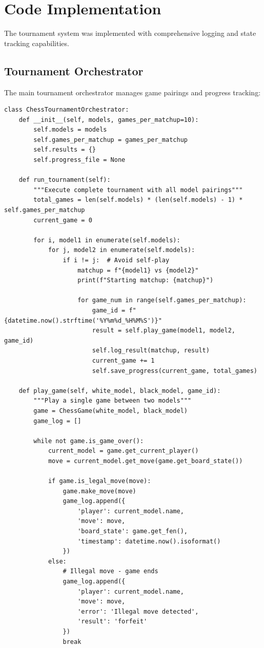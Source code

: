 \documentclass[11pt,a4paper]{report}
\begin{document}
\section{Code Implementation}
The tournament system was implemented with comprehensive logging and state tracking capabilities.

\subsection{Tournament Orchestrator}
The main tournament orchestrator manages game pairings and progress tracking:

\begin{lstlisting}[style=Python]
class ChessTournamentOrchestrator:
    def __init__(self, models, games_per_matchup=10):
        self.models = models
        self.games_per_matchup = games_per_matchup
        self.results = {}
        self.progress_file = None
        
    def run_tournament(self):
        """Execute complete tournament with all model pairings"""
        total_games = len(self.models) * (len(self.models) - 1) * self.games_per_matchup
        current_game = 0
        
        for i, model1 in enumerate(self.models):
            for j, model2 in enumerate(self.models):
                if i != j:  # Avoid self-play
                    matchup = f"{model1} vs {model2}"
                    print(f"Starting matchup: {matchup}")
                    
                    for game_num in range(self.games_per_matchup):
                        game_id = f"{datetime.now().strftime('%Y%m%d_%H%M%S')}"
                        result = self.play_game(model1, model2, game_id)
                        self.log_result(matchup, result)
                        current_game += 1
                        self.save_progress(current_game, total_games)
                        
    def play_game(self, white_model, black_model, game_id):
        """Play a single game between two models"""
        game = ChessGame(white_model, black_model)
        game_log = []
        
        while not game.is_game_over():
            current_model = game.get_current_player()
            move = current_model.get_move(game.get_board_state())
            
            if game.is_legal_move(move):
                game.make_move(move)
                game_log.append({
                    'player': current_model.name,
                    'move': move,
                    'board_state': game.get_fen(),
                    'timestamp': datetime.now().isoformat()
                })
            else:
                # Illegal move - game ends
                game_log.append({
                    'player': current_model.name,
                    'move': move,
                    'error': 'Illegal move detected',
                    'result': 'forfeit'
                })
                break
                

\end{lstlisting}
\end{document}
